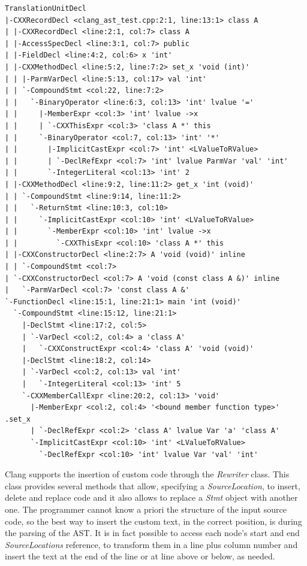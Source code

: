 \documentclass[a4paper,11pt,oneside]{book}
\begin{document}
\begin{lstlisting}[language=AST, caption=Clang AST of the simple code., label=ast]
TranslationUnitDecl
|-CXXRecordDecl <clang_ast_test.cpp:2:1, line:13:1> class A
| |-CXXRecordDecl <line:2:1, col:7> class A
| |-AccessSpecDecl <line:3:1, col:7> public
| |-FieldDecl <line:4:2, col:6> x 'int'
| |-CXXMethodDecl <line:5:2, line:7:2> set_x 'void (int)'
| | |-ParmVarDecl <line:5:13, col:17> val 'int'
| | `-CompoundStmt <col:22, line:7:2>
| |   `-BinaryOperator <line:6:3, col:13> 'int' lvalue '='
| |     |-MemberExpr <col:3> 'int' lvalue ->x
| |     | `-CXXThisExpr <col:3> 'class A *' this
| |     `-BinaryOperator <col:7, col:13> 'int' '*'
| |       |-ImplicitCastExpr <col:7> 'int' <LValueToRValue>
| |       | `-DeclRefExpr <col:7> 'int' lvalue ParmVar 'val' 'int'
| |       `-IntegerLiteral <col:13> 'int' 2
| |-CXXMethodDecl <line:9:2, line:11:2> get_x 'int (void)'
| | `-CompoundStmt <line:9:14, line:11:2>
| |   `-ReturnStmt <line:10:3, col:10>
| |     `-ImplicitCastExpr <col:10> 'int' <LValueToRValue>
| |       `-MemberExpr <col:10> 'int' lvalue ->x
| |         `-CXXThisExpr <col:10> 'class A *' this
| |-CXXConstructorDecl <line:2:7> A 'void (void)' inline
| | `-CompoundStmt <col:7>
| `-CXXConstructorDecl <col:7> A 'void (const class A &)' inline
|   `-ParmVarDecl <col:7> 'const class A &'
`-FunctionDecl <line:15:1, line:21:1> main 'int (void)'
  `-CompoundStmt <line:15:12, line:21:1>
    |-DeclStmt <line:17:2, col:5>
    | `-VarDecl <col:2, col:4> a 'class A'
    |   `-CXXConstructExpr <col:4> 'class A' 'void (void)'
    |-DeclStmt <line:18:2, col:14>
    | `-VarDecl <col:2, col:13> val 'int'
    |   `-IntegerLiteral <col:13> 'int' 5
    `-CXXMemberCallExpr <line:20:2, col:13> 'void'
      |-MemberExpr <col:2, col:4> '<bound member function type>' .set_x
      | `-DeclRefExpr <col:2> 'class A' lvalue Var 'a' 'class A'
      `-ImplicitCastExpr <col:10> 'int' <LValueToRValue>
        `-DeclRefExpr <col:10> 'int' lvalue Var 'val' 'int'
\end{lstlisting}


Clang supports the insertion of custom code through the \emph{Rewriter} class. This class provides several methods that allow, specifying a \emph{SourceLocation}, to insert, delete and replace code and it also allows to replace a \emph{Stmt} object with another one. The programmer cannot know a priori the structure of the input source code, so the best way to insert the custom text, in the correct position, is during the parsing of the AST. It is in fact possible to access each node’s start and end \emph{SourceLocations} reference, to transform them in a line plus column number and insert the text at the end of the line or at line above or below, as needed. 
\end{document}
